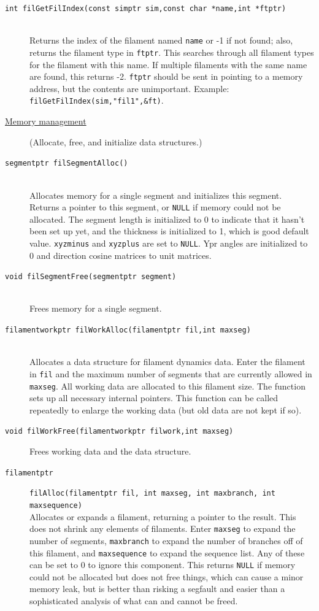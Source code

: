 \documentclass {scrbook}
\newcommand {\ttt} {\texttt}
\begin{document}
\begin{description}
\item[\ttt{int filGetFilIndex(const simptr sim,const char *name,int *ftptr)}]
\hfill \\
Returns the index of the filament named \ttt{name} or -1 if not found; also, returns the filament type in \ttt{ftptr}. This searches through all filament types for the filament with this name. If multiple filaments with the same name are found, this returns -2. \ttt{ftptr} should be sent in pointing to a memory address, but the contents are unimportant. Example: \ttt{filGetFilIndex(sim,"fil1",\&ft)}.


\item[\underline{Memory management}]
(Allocate, free, and initialize data structures.)

\item[\ttt{segmentptr filSegmentAlloc()}]
\hfill \\
Allocates memory for a single segment and initializes this segment. Returns a pointer to this segment, or \ttt{NULL} if memory could not be allocated. The segment length is initialized to 0 to indicate that it hasn't been set up yet, and the thickness is initialized to 1, which is good default value. \ttt{xyzminus} and \ttt{xyzplus} are set to \ttt{NULL}. Ypr angles are initialized to 0 and direction cosine matrices to unit matrices.

\item[\ttt{void filSegmentFree(segmentptr segment)}]
\hfill \\
Frees memory for a single segment.

\item[\ttt{filamentworkptr filWorkAlloc(filamentptr fil,int maxseg)}]
\hfill \\
Allocates a data structure for filament dynamics data. Enter the filament in \ttt{fil} and the maximum number of segments that are currently allowed in \ttt{maxseg}. All working data are allocated to this filament size. The function sets up all necessary internal pointers. This function can be called repeatedly to enlarge the working data (but old data are not kept if so).

\item[\ttt{void filWorkFree(filamentworkptr filwork,int maxseg)}]
Frees working data and the data structure.

\item[\ttt{filamentptr}]
\ttt{filAlloc(filamentptr fil, int maxseg, int maxbranch, int maxsequence)}
\hfill \\
Allocates or expands a filament, returning a pointer to the result. This does not shrink any elements of filaments. Enter \ttt{maxseg} to expand the number of segments, \ttt{maxbranch} to expand the number of branches off of this filament, and \ttt{maxsequence} to expand the sequence list. Any of these can be set to 0 to ignore this component. This returns \ttt{NULL} if memory could not be allocated but does not free things, which can cause a minor memory leak, but is better than risking a segfault and easier than a sophisticated analysis of what can and cannot be freed.


\end{description}
\end{document}
